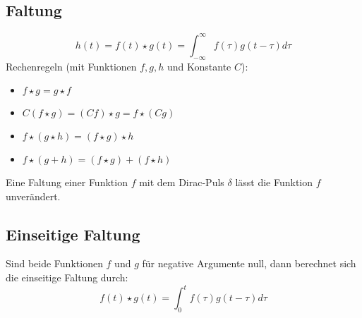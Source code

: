 \documentclass[12pt]{article}
\begin{document}
\subsection{Faltung}
\begin{equation*}
	h(t) = f(t)\star g(t)=\int_{-\infty}^\infty f(\tau)g(t-\tau)d\tau
\end{equation*}
Rechenregeln (mit Funktionen $f,g,h$ und Konstante $C$):
\begin{itemize}
	\item $f\star g = g\star f$
	\item $C(f\star g) = (Cf)\star g=f\star (Cg)$
	\item $f\star (g\star h)=(f\star g)\star h$
	\item $f\star (g + h)=(f\star g) + (f\star h)$
\end{itemize}
Eine Faltung einer Funktion $f$ mit dem Dirac-Puls $\delta$ lässt die Funktion $f$ unverändert.\\
\subsection{Einseitige Faltung}
Sind beide Funktionen $f$ und $g$ für negative Argumente null, dann berechnet sich die einseitige Faltung durch:
\begin{equation*}
	f(t)\star g(t)=\int_0^tf(\tau)g(t-\tau)d\tau
\end{equation*}
\end{document}
